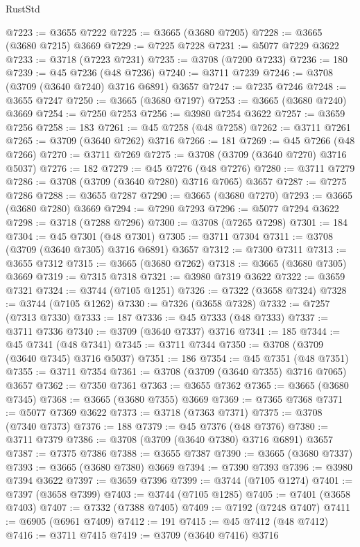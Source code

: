 \begin{lexlean}{RustStd}
\begin{coremodule}
@7223 := @3655 @7222
@7225 := @3665 (@3680 @7205)
@7228 := @3665 (@3680 @7215) @3669
@7229 := @7225 @7228
@7231 := @5077 @7229 @3622
@7233 := @3718 (@7223 @7231)
@7235 := @3708 (@7200 @7233)
@7236 := 180
@7239 := @45 @7236 (@48 @7236)
@7240 := @3711 @7239
@7246 := @3708 (@3709 (@3640 @7240) @3716 @6891) @3657
@7247 := @7235 @7246
@7248 := @3655 @7247
@7250 := @3665 (@3680 @7197)
@7253 := @3665 (@3680 @7240) @3669
@7254 := @7250 @7253
@7256 := @3980 @7254 @3622
@7257 := @3659 @7256
@7258 := 183
@7261 := @45 @7258 (@48 @7258)
@7262 := @3711 @7261
@7265 := @3709 (@3640 @7262) @3716
@7266 := 181
@7269 := @45 @7266 (@48 @7266)
@7270 := @3711 @7269
@7275 := @3708 (@3709 (@3640 @7270) @3716 @5037)
@7276 := 182
@7279 := @45 @7276 (@48 @7276)
@7280 := @3711 @7279
@7286 := @3708 (@3709 (@3640 @7280) @3716 @7065) @3657
@7287 := @7275 @7286
@7288 := @3655 @7287
@7290 := @3665 (@3680 @7270)
@7293 := @3665 (@3680 @7280) @3669
@7294 := @7290 @7293
@7296 := @5077 @7294 @3622
@7298 := @3718 (@7288 @7296)
@7300 := @3708 (@7265 @7298)
@7301 := 184
@7304 := @45 @7301 (@48 @7301)
@7305 := @3711 @7304
@7311 := @3708 (@3709 (@3640 @7305) @3716 @6891) @3657
@7312 := @7300 @7311
@7313 := @3655 @7312
@7315 := @3665 (@3680 @7262)
@7318 := @3665 (@3680 @7305) @3669
@7319 := @7315 @7318
@7321 := @3980 @7319 @3622
@7322 := @3659 @7321
@7324 := @3744 (@7105 @1251)
@7326 := @7322 (@3658 @7324)
@7328 := @3744 (@7105 @1262)
@7330 := @7326 (@3658 @7328)
@7332 := @7257 (@7313 @7330)
@7333 := 187
@7336 := @45 @7333 (@48 @7333)
@7337 := @3711 @7336
@7340 := @3709 (@3640 @7337) @3716
@7341 := 185
@7344 := @45 @7341 (@48 @7341)
@7345 := @3711 @7344
@7350 := @3708 (@3709 (@3640 @7345) @3716 @5037)
@7351 := 186
@7354 := @45 @7351 (@48 @7351)
@7355 := @3711 @7354
@7361 := @3708 (@3709 (@3640 @7355) @3716 @7065) @3657
@7362 := @7350 @7361
@7363 := @3655 @7362
@7365 := @3665 (@3680 @7345)
@7368 := @3665 (@3680 @7355) @3669
@7369 := @7365 @7368
@7371 := @5077 @7369 @3622
@7373 := @3718 (@7363 @7371)
@7375 := @3708 (@7340 @7373)
@7376 := 188
@7379 := @45 @7376 (@48 @7376)
@7380 := @3711 @7379
@7386 := @3708 (@3709 (@3640 @7380) @3716 @6891) @3657
@7387 := @7375 @7386
@7388 := @3655 @7387
@7390 := @3665 (@3680 @7337)
@7393 := @3665 (@3680 @7380) @3669
@7394 := @7390 @7393
@7396 := @3980 @7394 @3622
@7397 := @3659 @7396
@7399 := @3744 (@7105 @1274)
@7401 := @7397 (@3658 @7399)
@7403 := @3744 (@7105 @1285)
@7405 := @7401 (@3658 @7403)
@7407 := @7332 (@7388 @7405)
@7409 := @7192 (@7248 @7407)
@7411 := @6905 (@6961 @7409)
@7412 := 191
@7415 := @45 @7412 (@48 @7412)
@7416 := @3711 @7415
@7419 := @3709 (@3640 @7416) @3716

\end{coremodule}
\end{lexlean}
